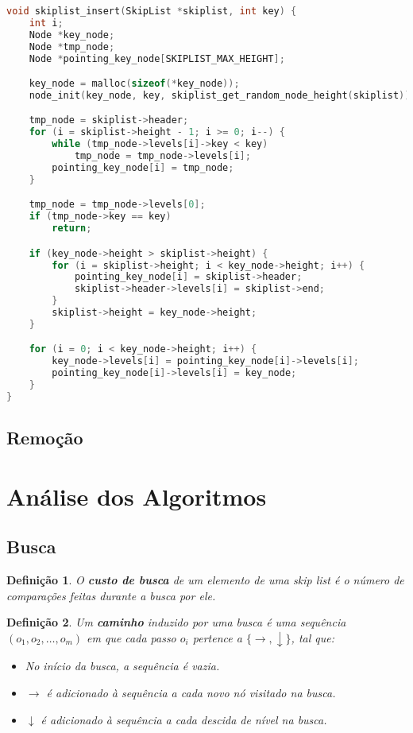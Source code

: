 \documentclass[paper=a4, fontsize=11pt]{scrartcl} %
\newtheorem{definition}{Definição}
\numberwithin{equation}{section}
\numberwithin{figure}{section}
\numberwithin{table}{section}
\numberwithin{definition}{section}
\numberwithin{theorem}{section}
\numberwithin{property}{section}
\numberwithin{proposition}{section}
\renewcommand{\sl}{\textit{skip list}\xspace}
\begin{document}
\begin{lstlisting}[caption=Inserção., language=C]
void skiplist_insert(SkipList *skiplist, int key) {
    int i;
    Node *key_node;
    Node *tmp_node;
    Node *pointing_key_node[SKIPLIST_MAX_HEIGHT];

    key_node = malloc(sizeof(*key_node));
    node_init(key_node, key, skiplist_get_random_node_height(skiplist));

    tmp_node = skiplist->header;
    for (i = skiplist->height - 1; i >= 0; i--) {
        while (tmp_node->levels[i]->key < key)
            tmp_node = tmp_node->levels[i];
        pointing_key_node[i] = tmp_node;
    }

    tmp_node = tmp_node->levels[0];
    if (tmp_node->key == key) 
        return;

    if (key_node->height > skiplist->height) {
        for (i = skiplist->height; i < key_node->height; i++) {
            pointing_key_node[i] = skiplist->header;
            skiplist->header->levels[i] = skiplist->end;
        }
        skiplist->height = key_node->height;
    }

    for (i = 0; i < key_node->height; i++) {
        key_node->levels[i] = pointing_key_node[i]->levels[i];
        pointing_key_node[i]->levels[i] = key_node;
    }
}
\end{lstlisting}

\subsection{Remoção}




\pagebreak
\section{Análise dos Algoritmos}


\subsection{Busca}


\begin{definition}

O \textbf{custo de busca} de um elemento de uma \sl é o número de comparações feitas durante a busca por ele.

\end{definition}

\begin{definition}

Um \textbf{caminho} induzido por uma busca é uma sequência $(o_1, o_2, \ldots, o_m)$ 
em que cada passo $o_i$ pertence a $\{\rightarrow, \downarrow\}$, tal que:

\begin{itemize}[noitemsep]
  \item No início da busca, a sequência é vazia.
  \item $\rightarrow$ é adicionado à sequência a cada novo nó visitado na busca.
  \item $\downarrow$ é adicionado à sequência a cada descida de nível na busca.
\end{itemize}

\end{definition}
\end{document}

